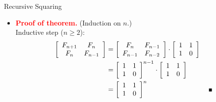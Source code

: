 \documentclass{beamer}
\begin{document}
\begin{frame}{Recursive Squaring}
    \begin{itemize}
        \item[] \textbf{\textcolor{red}{Proof of theorem.}} (Induction on $n$.) \\
            Inductive step ($n \geq 2$): \pause
            \begin{equation*}
                \begin{split}
                    \left[
                        \begin{array}{c c}
                            F_{n + 1} & F_n \\
                            F_n       & F_{n - 1}
                        \end{array}
                    \right]
                &=
                    \left[
                        \begin{array}{c c}
                            F_n       & F_{n - 1} \\
                            F_{n - 1} & F_{n - 2}
                        \end{array}
                    \right]
                    \cdot
                    \left[
                        \begin{array}{c c}
                            1 & 1 \\
                            1 & 0
                        \end{array}
                    \right] \\
                &=
                    \left[
                        \begin{array}{c c}
                            1 & 1 \\
                            1 & 0
                        \end{array}
                    \right]^{n - 1}
                    \cdot
                    \left[
                        \begin{array}{c c}
                            1 & 1 \\
                            1 & 0
                        \end{array}
                    \right] \\
                &=
                    \left[
                        \begin{array}{c c}
                            1 & 1 \\
                            1 & 0
                        \end{array}
                    \right]^n \text{\tiny \hspace{30mm} $\blacksquare$} \\
                \end{split}
            \end{equation*}

    \end{itemize}
\end{frame}
\end{document}
